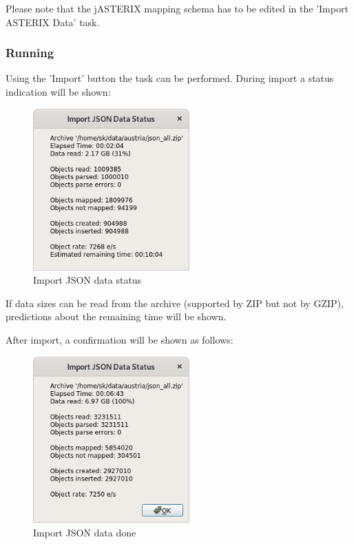 Please note that the jASTERIX mapping schema has to be edited in the 'Import ASTERIX Data' task.




\subsubsection{Running}

Using the 'Import' button the task can be performed. During import a status indication will be shown:

\begin{figure}[H]
  \center
    \includegraphics[width=6cm]{figures/json_import_status.png}
  \caption{Import JSON data status}
\end{figure}

If data sizes can be read from the archive (supported by ZIP but not by GZIP), predictions about the remaining time will be shown.

After import, a confirmation will be shown as follows:

\begin{figure}[H]
  \center
    \includegraphics[width=6cm,frame]{figures/json_import_done.png}
  \caption{Import JSON data done}
\end{figure}




